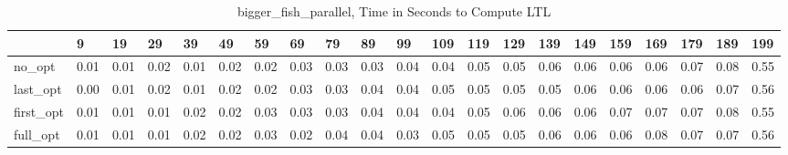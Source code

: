 \begin{table}
\caption{bigger_fish_parallel, Time in Seconds to Compute LTL}
\label{bigger_fish_parallel_LTL_time}
\begin{tabular}{lllllllllllllllllllll}
\toprule
 & 9 & 19 & 29 & 39 & 49 & 59 & 69 & 79 & 89 & 99 & 109 & 119 & 129 & 139 & 149 & 159 & 169 & 179 & 189 & 199 \\
\midrule
no_opt & 0.01 & 0.01 & 0.02 & 0.01 & 0.02 & 0.02 & 0.03 & 0.03 & 0.03 & 0.04 & 0.04 & 0.05 & 0.05 & 0.06 & 0.06 & 0.06 & 0.06 & 0.07 & 0.08 & 0.55 \\
last_opt & 0.00 & 0.01 & 0.02 & 0.01 & 0.02 & 0.02 & 0.03 & 0.03 & 0.04 & 0.04 & 0.05 & 0.05 & 0.05 & 0.05 & 0.06 & 0.06 & 0.06 & 0.06 & 0.07 & 0.56 \\
first_opt & 0.01 & 0.01 & 0.01 & 0.02 & 0.02 & 0.03 & 0.03 & 0.03 & 0.04 & 0.04 & 0.04 & 0.05 & 0.06 & 0.06 & 0.06 & 0.07 & 0.07 & 0.07 & 0.08 & 0.55 \\
full_opt & 0.01 & 0.01 & 0.01 & 0.02 & 0.02 & 0.03 & 0.02 & 0.04 & 0.04 & 0.03 & 0.05 & 0.05 & 0.05 & 0.06 & 0.06 & 0.06 & 0.08 & 0.07 & 0.07 & 0.56 \\
\bottomrule
\end{tabular}
\end{table}
